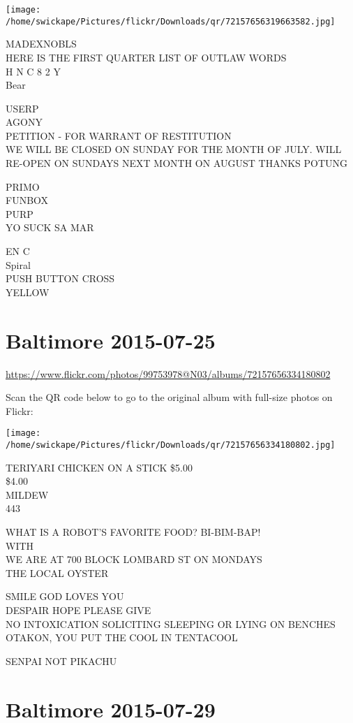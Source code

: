 \documentclass[10pt,letterpaper]{article}
\begin{document}
\texttt{[image: /home/swickape/Pictures/flickr/Downloads/qr/72157656319663582.jpg]}


MADEXNOBLS\\
HERE IS THE FIRST QUARTER LIST OF OUTLAW WORDS\\
H N C 8 2 Y\\
Bear

USERP\\
AGONY\\
PETITION {-} FOR WARRANT OF RESTITUTION\\
WE WILL BE CLOSED ON SUNDAY FOR THE MONTH OF JULY.  WILL RE{-}OPEN ON SUNDAYS NEXT MONTH ON AUGUST THANKS POTUNG

PRIMO\\
FUNBOX\\
PURP\\
YO SUCK SA MAR

EN C\\
Spiral\\
PUSH BUTTON CROSS\\
YELLOW


\section*{Baltimore 2015-07-25}

\url{https://www.flickr.com/photos/99753978@N03/albums/72157656334180802}

Scan the QR code below to go to the original album with full-size photos on Flickr:

\texttt{[image: /home/swickape/Pictures/flickr/Downloads/qr/72157656334180802.jpg]}


TERIYARI CHICKEN ON A STICK \$5.00\\
\$4.00\\
MILDEW\\
443

WHAT IS A ROBOT'S FAVORITE FOOD?  BI{-}BIM{-}BAP!\\
WITH\\
WE ARE AT 700 BLOCK LOMBARD ST ON MONDAYS\\
THE LOCAL OYSTER

SMILE GOD LOVES YOU\\
DESPAIR HOPE PLEASE GIVE\\
NO INTOXICATION SOLICITING SLEEPING OR LYING ON BENCHES\\
OTAKON, YOU PUT THE COOL IN TENTACOOL

SENPAI NOT PIKACHU


\section*{Baltimore 2015-07-29}
\end{document}
